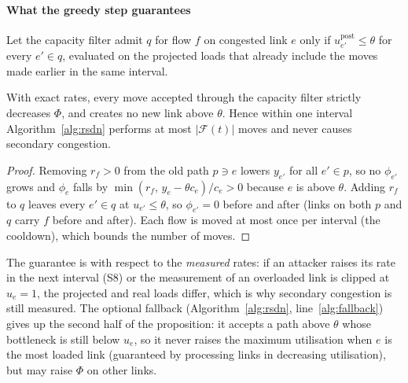 \paragraph{What the greedy step guarantees}
Let the capacity filter admit $q$ for flow $f$ on congested link $e$ only if
$u_{e'}^{\mathrm{post}}\le\theta$ for every $e'\in q$, evaluated on the projected loads that
already include the moves made earlier in the same interval.
\begin{proposition}\label{prop:monotone}
With exact rates, every move accepted through the capacity filter strictly decreases $\Phi$, and
creates no new link above $\theta$. Hence within one interval Algorithm~\ref{alg:rsdn} performs at
most $|\mathcal{F}(t)|$ moves and never causes secondary congestion.
\end{proposition}
\begin{proof}
Removing $r_f>0$ from the old path $p\ni e$ lowers $y_{e'}$ for all $e'\in p$, so no $\phi_{e'}$
grows and $\phi_e$ falls by $\min(r_f,\,y_e-\theta c_e)/c_e>0$ because $e$ is above $\theta$.
Adding $r_f$ to $q$ leaves every $e'\in q$ at $u_{e'}\le\theta$, so $\phi_{e'}=0$ before and
after (links on both $p$ and $q$ carry $f$ before and after). Each flow is moved at most once
per interval (the cooldown), which bounds the number of moves.
\end{proof}
The guarantee is with respect to the \emph{measured} rates: if an attacker raises its rate in
the next interval (S8) or the measurement of an overloaded link is clipped at $\hat u_e=1$, the
projected and real loads differ, which is why secondary congestion is still measured. The optional
fallback (Algorithm~\ref{alg:rsdn}, line~\ref{alg:fallback}) gives up the second half of the
proposition: it accepts a path above $\theta$ whose bottleneck is still below $u_e$, so it never
raises the maximum utilisation when $e$ is the most loaded link (guaranteed by processing links in
decreasing utilisation), but may raise $\Phi$ on other links.


